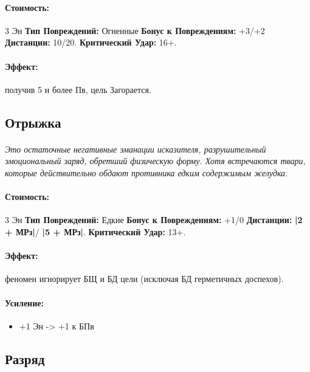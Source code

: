 \paragraph{Стоимость: }3 Эн
\newline
\textbf{Тип Повреждений: }Огненные
\newline
\textbf{Бонус к Повреждениям: }+3/+2
\newline
\textbf{Дистанции: }10/20.
\newline
\textbf{Критический Удар: }16+.
\paragraph{Эффект: }получив 5 и более Пв, цель Загорается.
\subsection{Отрыжка}
\paragraph{} 
\textit{Это остаточные негативные эманации исказителя, разрушительный эмоциональный заряд, обретший физическую форму. Хотя встречаются твари, которые действительно обдают противника едким содержимым желудка.}
\paragraph{Стоимость: }3 Эн
\newline
\textbf{Тип Повреждений: }Едкие
\newline
\textbf{Бонус к Повреждениям: }+1/0
\newline
\textbf{Дистанции: }
\textbf{|2 + МРз|}/
\textbf{|5 + МРз|}.
\newline
\textbf{Критический Удар: }13+.
\paragraph{Эффект: }феномен игнорирует БЩ и БД цели (исключая БД герметичных доспехов).
\paragraph{Усиление:}
\begin{itemize}
\item+1 Эн -> +1 к БПв
\end{itemize}
\subsection{Разряд}
